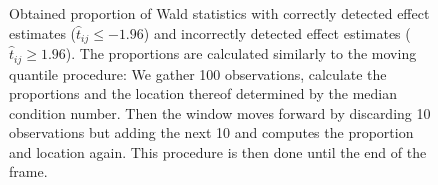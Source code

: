 \documentclass[11pt,a4paper,twoside]{book}\usepackage[]{graphicx}\usepackage[]{xcolor}
\begin{document}
\begin{figure}[H]
\begin{subfigure}[b]{1\textwidth}
\end{subfigure}
\vspace*{-0.9cm}
\caption{Obtained proportion of Wald statistics with correctly detected effect estimates ($\hat{t}_{ij}\leq -1.96$) and incorrectly detected effect estimates ($\hat{t}_{ij}\geq 1.96$). The proportions are calculated similarly to the moving quantile procedure: We gather 100 observations, calculate the proportions and the location thereof determined by the median condition number. Then the window moves forward by discarding 10 observations but adding the next 10 and computes the proportion and location again. This procedure is then done until the end of the frame.}
\label{fig:simres_prop1}
\end{figure}

\vspace*{-1cm}
\end{document}
